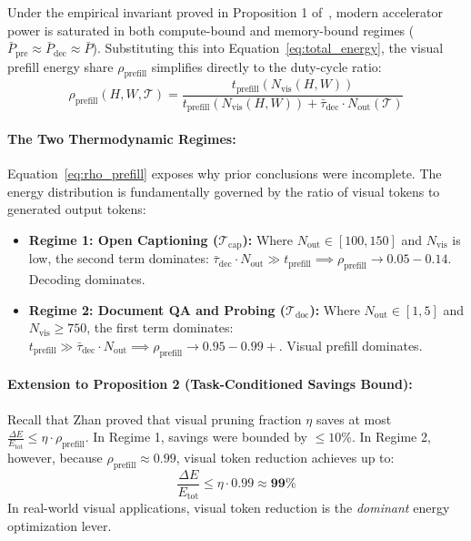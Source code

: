 Under the empirical invariant proved in Proposition 1 of~\cite{zhan2026seeing}, modern accelerator power is saturated in both compute-bound and memory-bound regimes ($\bar{P}_{\text{pre}} \approx \bar{P}_{\text{dec}} \approx \bar{P}$). Substituting this into Equation~\ref{eq:total_energy}, the visual prefill energy share $\rho_{\text{prefill}}$ simplifies directly to the duty-cycle ratio:
\begin{equation}
    \rho_{\text{prefill}}(H, W, \mathcal{T}) = \frac{t_{\text{prefill}}(N_{\text{vis}}(H, W))}{t_{\text{prefill}}(N_{\text{vis}}(H, W)) + \bar{\tau}_{\text{dec}} \cdot N_{\text{out}}(\mathcal{T})}
    \label{eq:rho_prefill}
\end{equation}

\paragraph{The Two Thermodynamic Regimes:}
Equation~\ref{eq:rho_prefill} exposes why prior conclusions were incomplete. The energy distribution is fundamentally governed by the ratio of visual tokens to generated output tokens:
\begin{itemize}[leftmargin=*]
    \item \textbf{Regime 1: Open Captioning ($\mathcal{T}_{\text{cap}}$):} Where $N_{\text{out}} \in [100, 150]$ and $N_{\text{vis}}$ is low, the second term dominates: $\bar{\tau}_{\text{dec}} \cdot N_{\text{out}} \gg t_{\text{prefill}} \implies \rho_{\text{prefill}} \to 0.05 - 0.14$. Decoding dominates.
    \item \textbf{Regime 2: Document QA and Probing ($\mathcal{T}_{\text{doc}}$):} Where $N_{\text{out}} \in [1, 5]$ and $N_{\text{vis}} \ge 750$, the first term dominates: $t_{\text{prefill}} \gg \bar{\tau}_{\text{dec}} \cdot N_{\text{out}} \implies \rho_{\text{prefill}} \to 0.95 - 0.99+$. Visual prefill dominates.
\end{itemize}

\paragraph{Extension to Proposition 2 (Task-Conditioned Savings Bound):}
Recall that Zhan \etal proved that visual pruning fraction $\eta$ saves at most $\frac{\Delta E}{E_{\text{tot}}} \le \eta \cdot \rho_{\text{prefill}}$. In Regime 1, savings were bounded by $\le 10\%$. In Regime 2, however, because $\rho_{\text{prefill}} \approx 0.99$, visual token reduction achieves up to:
\begin{equation}
    \frac{\Delta E}{E_{\text{tot}}} \le \eta \cdot 0.99 \approx \mathbf{99\%}
\end{equation}
In real-world visual applications, visual token reduction is the \emph{dominant} energy optimization lever.

